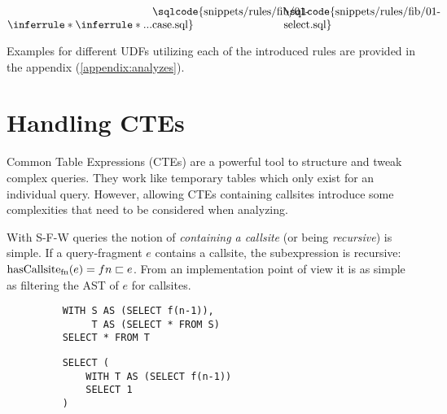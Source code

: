 

$
\inferrule*{
    \inferrule*{...}{
{\begin{minipage}[b]{12em}
\sqlcode{snippets/rules/fib/01-case.sql}
\end{minipage}}
    }
}{
{\begin{minipage}[b]{12em}
\sqlcode{snippets/rules/fib/01-select.sql}
\end{minipage}}
}
$

\fi

Examples for different UDFs utilizing each of the introduced rules are provided in the appendix (\autoref{appendix:analyzes}).


\section{Handling CTEs}

Common Table Expressions (CTEs) are a powerful tool to structure and tweak complex queries. They work like temporary tables which only exist for an individual query. However, allowing CTEs containing callsites introduce some complexities that need to be considered when analyzing.

With S-F-W queries the notion of \textit{containing a callsite} (or being \textit{recursive}) is simple. If a query-fragment $e$ contains a callsite, the subexpression is recursive: $\operatorname{\text{hasCallsite}_{fn}}(e) = fn \sqsubset e$. From an implementation point of view it is as simple as filtering the AST of $e$ for callsites.

\begin{wrapfigure}{r}{.5\textwidth} 
    \begin{minipage}{\linewidth}
    \label{fig:simple_indiref}\par\vfill
    \begin{verbatim}
    WITH S AS (SELECT f(n-1)),
         T AS (SELECT * FROM S)
    SELECT * FROM T
    \end{verbatim}
    \label{fig:indirect_callsite}\par
    \vspace{3mm}
    \begin{verbatim}
    SELECT (
        WITH T AS (SELECT f(n-1))
        SELECT 1
    )
    \end{verbatim}
    \label{fig:unused_callsite}
\end{minipage}
\caption{}
\label{lst:indirect_callsite_ref}\vspace{-5mm} 
\end{wrapfigure}

